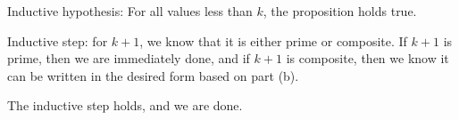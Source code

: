 \documentclass[10pt]{article}
\begin{document}
\begin{enumerate}[label=\alph*)]
\begin{solution}
				Inductive hypothesis: For all values less than  \( k \), 
				the proposition holds true. 

				Inductive step: for \( k + 1 \), we know that it is either prime 
				or composite. If \( k + 1 \) is prime, then we are immediately done, 
				and if \( k + 1 \) is composite, then we know it can be written 
				in the desired form based on part (b). 

				The inductive step holds, and we are done. 
			\end{solution}
	\end{enumerate}
\end{document}
